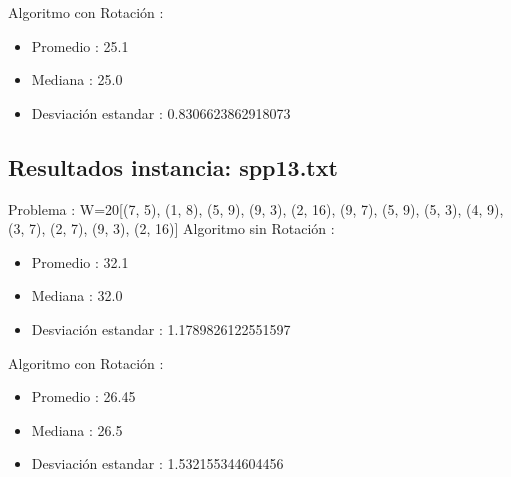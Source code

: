 \documentclass{article}%
\begin{document}
%
Algoritmo con Rotación : %
\begin{itemize}%
\item%
Promedio : 25.1%
\item%
Mediana : 25.0%
\item%
Desviación estandar : 0.8306623862918073%
\end{itemize}%
\subsection{Resultados instancia: spp13.txt}%
\label{subsec:Resultadosinstanciaspp13.txt}%
Problema : W=20{[}(7, 5), (1, 8), (5, 9), (9, 3), (2, 16), (9, 7), (5, 9), (5, 3), (4, 9), (3, 7), (2, 7), (9, 3), (2, 16){]} \newline%
%
 Algoritmo sin Rotación : %
\begin{itemize}%
\item%
Promedio : 32.1%
\item%
Mediana : 32.0%
\item%
Desviación estandar : 1.1789826122551597%
\end{itemize}

%
Algoritmo con Rotación : %
\begin{itemize}%
\item%
Promedio : 26.45%
\item%
Mediana : 26.5%
\item%
Desviación estandar : 1.532155344604456%
\end{itemize}

%
\end{document}
